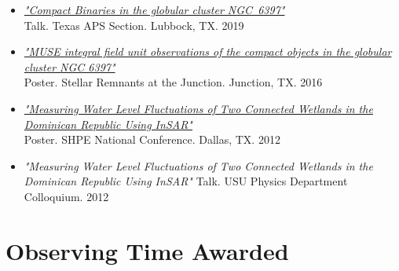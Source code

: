 \documentclass[letterpaper,10pt]{article}
\begin{document}
\begin{itemize}[label=$\blacktriangleright$]

\item \textit{\href{https://manuelpm.me/TexasAPS2019/}{"Compact Binaries in the globular cluster NGC~6397"}} \\Talk. Texas APS Section. Lubbock, TX. 2019



\item \textit{\href{http://manuelpm.me/papers/MUSEposter.pdf}{"MUSE integral field unit observations of the compact objects in the globular cluster NGC 6397"}} \\Poster. Stellar Remnants at the Junction. Junction, TX. 2016




\item \textit{\href{http://manuelpm.me/papers/posterinsar.pdf}{"Measuring Water Level Fluctuations of Two Connected Wetlands in the Dominican Republic Using InSAR"}} \\Poster. SHPE National Conference. Dallas, TX. 2012

\item \emph{"Measuring Water Level Fluctuations of Two Connected Wetlands in the Dominican Republic Using InSAR"}
Talk. USU Physics Department Colloquium. 2012
\end{itemize}
\begin{comment}
\subsection*{Media Coverage}

\begin{itemize}[label=$\blacktriangleright$]

\item \hyperref[https://phys.org/news/2017-03-planetary-earth-sun.html]{Planetary waves, first found on Earth, are discovered on Sun (phys.org)}

\end{itemize}
\end{comment}
\section*{Observing Time Awarded }       
\end{document}
